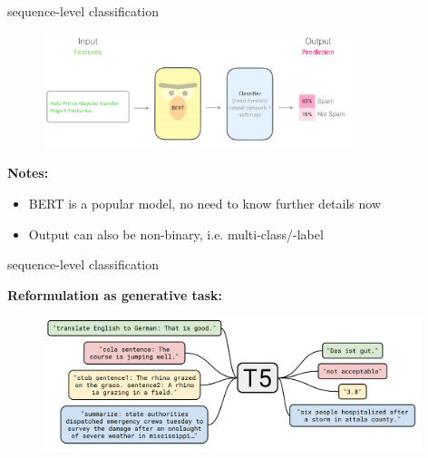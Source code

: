 \begin{vbframe}{sequence-level classification}

\vfill

	\begin{figure}
		\centering
		\includegraphics[width = 9cm]{figure/seqlevel.png}\\ 
	\end{figure}
	
\textbf{Notes:}

\begin{itemize}
	\item BERT is a popular model, no need to know further details now 
	\item Output can also be non-binary, i.e. multi-class/-label 
\end{itemize}

\vfill

\end{vbframe}


\begin{vbframe}{sequence-level classification}

\vfill

\textbf{Reformulation as generative task:}

	\begin{figure}
		\centering
		\includegraphics[width = 11cm]{../chapter06-post-bert-t5/figure/62-t5.png}\\ 
	\end{figure}

\vfill

\end{vbframe}

